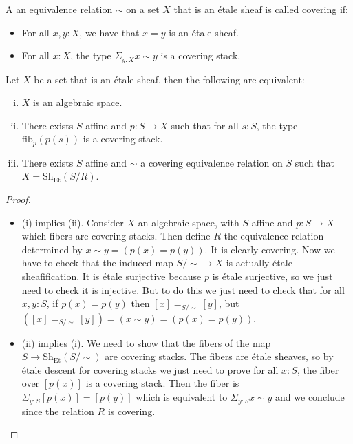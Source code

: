 \begin{definition}
A an equivalence relation $\sim$ on a set $X$ that is an étale sheaf is called covering if:
\begin{itemize}
\item For all $x,y:X$, we have that $x=y$ is an étale sheaf.
\item For all $x:X$, the type $\Sigma_{y:X}x\sim y$ is a covering stack.
\end{itemize}
\end{definition}

\begin{lemma}\label{algebraic-space-as-quotient}
Let $X$ be a set that is an étale sheaf, then the following are equivalent:
\begin{enumerate}[(i)]
\item $X$ is an algebraic space.
\item There exists $S$ affine and $p:S\to X$ such that for all $s:S$, the type $\mathrm{fib}_p(p(s))$ is a covering stack.
\item There exists $S$ affine and $\sim$ a covering equivalence relation on $S$ such that $X = \mathrm{Sh}_\mathrm{Et}(S/R)$. 
\end{enumerate}
\end{lemma}

\begin{proof}
\begin{itemize}
\item (i) implies (ii). Consider $X$ an algebraic space, with $S$ affine and $p:S\to X$ which fibers are covering stacks. Then define $R$ the equivalence relation determined by $x\sim y = (p(x)=p(y))$. It is clearly covering. Now we have to check that the induced map $S/\sim \to X$ is actually étale sheafification. It is étale surjective because $p$ is étale surjective, so we just need to check it is injective. But to do this we just need to check that for all $x,y:S$, if $p(x)=p(y)$ then $[x]=_{S/\sim}[y]$, but $([x]=_{S/\sim}[y]) = (x\sim y) = (p(x)=p(y))$.
\item (ii) implies (i). We need to show that the fibers of the map $S\to \mathrm{Sh}_\mathrm{Et}(S/\sim)$ are covering stacks. The fibers are étale sheaves, so by étale descent for covering stacks we just need to prove for all $x:S$, the fiber over $[p(x)]$ is a covering stack. Then the fiber is $\Sigma_{y:S}[p(x)] = [p(y)]$ which is equivalent to $\Sigma_{y:S} x\sim y$ and we conclude since the relation $R$ is covering.
\end{itemize}
\end{proof}









